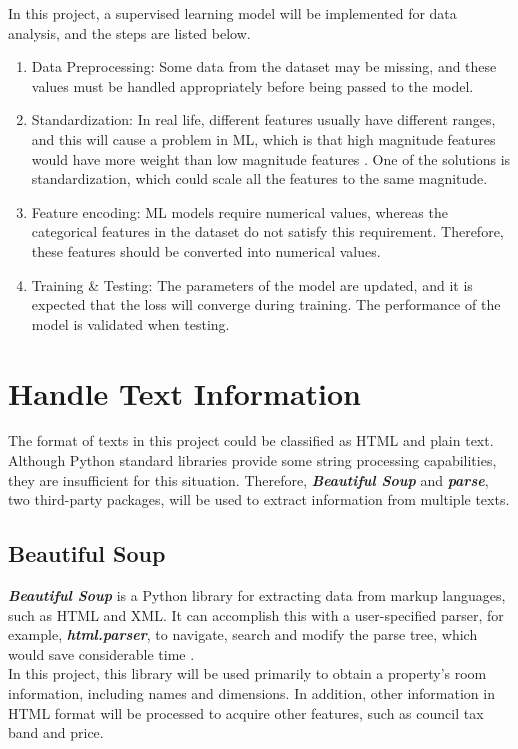 \documentclass[12pt,twoside]{report}
\begin{document}
In this project, a supervised learning model will be implemented for data analysis, and the steps are listed below.
\begin{enumerate}
	\item Data Preprocessing: Some data from the dataset may be missing, and these values must be handled appropriately before being passed to the model. 
	\item Standardization: In real life, different features usually have different ranges, and this will cause a problem in ML, which is that high magnitude features would have more weight than low magnitude features \citep{RN4}. One of the solutions is standardization, which could scale all the features to the same magnitude.
	\item Feature encoding: ML models require numerical values, whereas the categorical features in the dataset do not satisfy this requirement. Therefore, these features should be converted into numerical values. 
	\item Training \& Testing: The parameters of the model are updated, and it is expected that the loss will converge during training. The performance of the model is validated when testing.
\end{enumerate}

\section{Handle Text Information}
The format of texts in this project could be classified as HTML and plain text. Although Python standard libraries provide some string processing capabilities, they are insufficient for this situation. Therefore, \textit{\textbf{Beautiful Soup}} and \textit{\textbf{parse}}, two third-party packages, will be used to extract information from multiple texts.

\subsection{Beautiful Soup}
\textit{\textbf{Beautiful Soup}} is a Python library for extracting data from markup languages, such as HTML and XML. It can accomplish this with a user-specified parser, for example, \textbf{\textit{html.parser}}, to navigate, search and modify the parse tree, which would save considerable time \citep{RN10}. 
\\

In this project, this library will be used primarily to obtain a property's room information, including names and dimensions. In addition, other information in HTML format will be processed to acquire other features, such as council tax band and price. 
\end{document}
